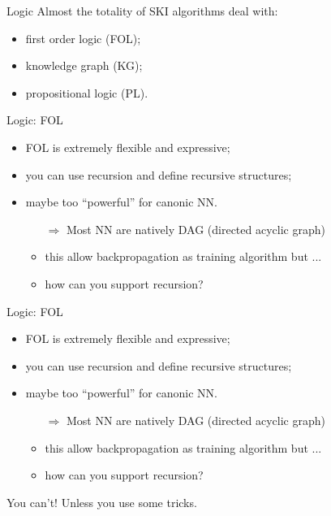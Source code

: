 \documentclass[presentation]{beamer}\mode<presentation>{\usetheme{AMSBolognaFC}}
\begin{document}
\begin{frame}[c]{Logic}
    Almost the totality of SKI algorithms deal with:
    \begin{itemize}
        \item \alert{first order logic} (FOL);
        \item \alert{knowledge graph} (KG);
        \item \alert{propositional logic} (PL).
        
    \end{itemize}
\end{frame}

\begin{frame}[c]{Logic: FOL}
    \begin{itemize}
        \item FOL is extremely flexible and expressive;
        \item you can use recursion and define recursive structures;
        \item maybe too ``powerful'' for canonic NN.
        \begin{itemize}
            \item[$\Rightarrow$] Most NN are natively DAG (directed acyclic graph)
            \item this allow backpropagation as training algorithm but ...
            \item how can you support recursion?  
        \end{itemize}
    \end{itemize}
    \centering\vfill
    \phantom{You can't!}
    \phantom{Unless you use some tricks.}
\end{frame}

\begin{frame}[c]{Logic: FOL}
    \begin{itemize}
        \item FOL is extremely flexible and expressive;
        \item you can use recursion and define recursive structures;
        \item maybe too ``powerful'' for canonic NN.
        \begin{itemize}
            \item[$\Rightarrow$] Most NN are natively DAG (directed acyclic graph)
            \item this allow backpropagation as training algorithm but ...
            \item how can you support recursion?  
        \end{itemize}
    \end{itemize}
    \centering\vfill
    You can't!
    Unless you use some tricks.
\end{frame}
\end{document}
